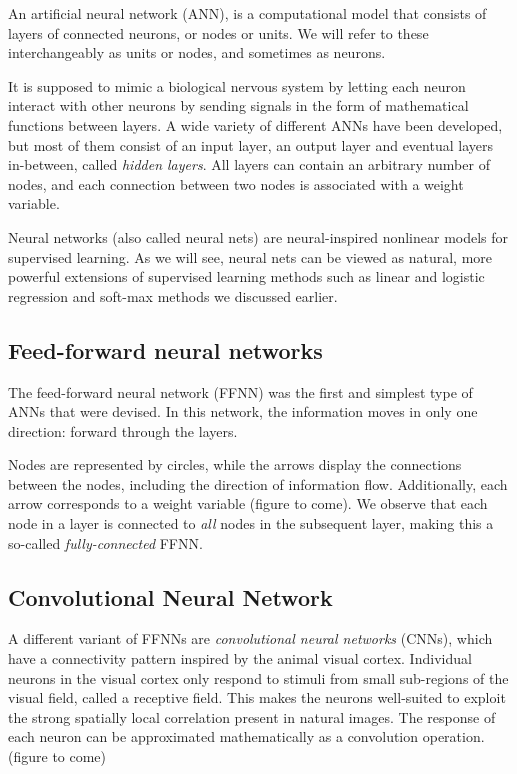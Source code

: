 \documentclass[%
oneside,                 %
final,                   %
10pt]{article}
\begin{document}
An artificial neural network (ANN), is a computational model that
consists of layers of connected neurons, or nodes or units.  We will
refer to these interchangeably as units or nodes, and sometimes as
neurons.

It is supposed to mimic a biological nervous system by letting each
neuron interact with other neurons by sending signals in the form of
mathematical functions between layers.  A wide variety of different
ANNs have been developed, but most of them consist of an input layer,
an output layer and eventual layers in-between, called \emph{hidden
layers}. All layers can contain an arbitrary number of nodes, and each
connection between two nodes is associated with a weight variable.

Neural networks (also called neural nets) are neural-inspired
nonlinear models for supervised learning.  As we will see, neural nets
can be viewed as natural, more powerful extensions of supervised
learning methods such as linear and logistic regression and soft-max
methods we discussed earlier.

\subsection{Feed-forward neural networks}

The feed-forward neural network (FFNN) was the first and simplest type
of ANNs that were devised. In this network, the information moves in
only one direction: forward through the layers.

Nodes are represented by circles, while the arrows display the
connections between the nodes, including the direction of information
flow. Additionally, each arrow corresponds to a weight variable
(figure to come).  We observe that each node in a layer is connected
to \emph{all} nodes in the subsequent layer, making this a so-called
\emph{fully-connected} FFNN.

\subsection{Convolutional Neural Network}

A different variant of FFNNs are \emph{convolutional neural networks}
(CNNs), which have a connectivity pattern inspired by the animal
visual cortex. Individual neurons in the visual cortex only respond to
stimuli from small sub-regions of the visual field, called a receptive
field. This makes the neurons well-suited to exploit the strong
spatially local correlation present in natural images. The response of
each neuron can be approximated mathematically as a convolution
operation.  (figure to come)
\end{document}
